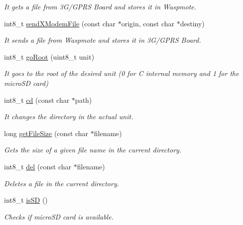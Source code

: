 \begin{DoxyCompactItemize}
\begin{DoxyCompactList}\small\item\em It gets a file from 3\+G/\+G\+P\+RS Board and stores it in Waspmote. \end{DoxyCompactList}\item 
int8\+\_\+t \hyperlink{class_wasp3_g_a96610f935ed1116979049be079241307}{send\+X\+Modem\+File} (const char $\ast$origin, const char $\ast$destiny)
\begin{DoxyCompactList}\small\item\em It sends a file from Waspmote and stores it in 3\+G/\+G\+P\+RS Board. \end{DoxyCompactList}\item 
int8\+\_\+t \hyperlink{class_wasp3_g_ab3a1d637cd4b2de36a2393f7138fc2d9}{go\+Root} (uint8\+\_\+t unit)
\begin{DoxyCompactList}\small\item\em It goes to the root of the desired unit (0 for C internal memory and 1 for the micro\+SD card) \end{DoxyCompactList}\item 
int8\+\_\+t \hyperlink{class_wasp3_g_acad00444b5ab2aca5a4b2730f86a94c3}{cd} (const char $\ast$path)
\begin{DoxyCompactList}\small\item\em It changes the directory in the actual unit. \end{DoxyCompactList}\item 
long \hyperlink{class_wasp3_g_afda93a0b63071d7b5cce7fae8ce9dfb5}{get\+File\+Size} (const char $\ast$filename)
\begin{DoxyCompactList}\small\item\em Gets the size of a given file name in the current directory. \end{DoxyCompactList}\item 
int8\+\_\+t \hyperlink{class_wasp3_g_a31f158bf20c189218bee47ebb3e511a2}{del} (const char $\ast$filename)
\begin{DoxyCompactList}\small\item\em Deletes a file in the current directory. \end{DoxyCompactList}\item 
int8\+\_\+t \hyperlink{class_wasp3_g_a0d91a7fb05b382f4f43ff510277373f9}{is\+SD} ()
\begin{DoxyCompactList}\small\item\em Checks if micro\+SD card is available. \end{DoxyCompactList}\item 

\end{DoxyCompactItemize}
